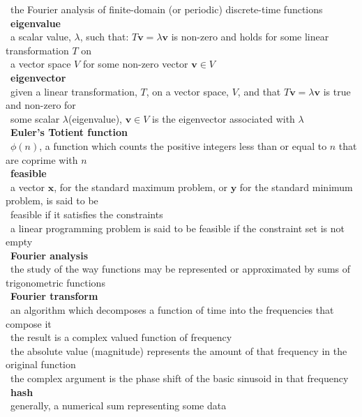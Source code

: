 \documentclass[10pt,letterpaper]{scrartcl}
\newcommand{\tbul}{\textbullet}
\newcommand{\tend}{\>\textendash}
\newcommand{\tasc}{\>\>\textasteriskcentered}
\begin{document}
\begin{tabbing}
    \tend\ the Fourier analysis of finite-domain (or periodic) discrete-time functions \\
\tbul\ \textbf{eigenvalue} \\
    \tend\ a scalar value, $\lambda$, such that: $T\mathbf{v}=\lambda\mathbf{v}$ is non-zero and holds for some linear transformation $T$ on \\ \>\ a vector space $V$ for some non-zero vector $\mathbf{v} \in V$\\
\tbul\ \textbf{eigenvector} \\
    \tend\ given a linear transformation, $T$, on a vector space, $V$, and that $T\mathbf{v}=\lambda\mathbf{v}$ is true and non-zero for \\ \>\ some scalar $\lambda$(eigenvalue), $\mathbf{v} \in V$ is the eigenvector associated with $\lambda$ \\
\tbul\ \textbf{Euler's Totient function} \\
    \tend\ $\phi (n)$, a function which counts the positive integers less than or equal to $n$ that are coprime with $n$\\
\tbul\ \textbf{feasible} \\
    \tend\ a vector $\mathbf{x}$, for the standard maximum problem, or $\mathbf{y}$ for the standard minimum problem, is said to be \\ \>\ feasible if it satisfies the constraints \\
    \tend\ a linear programming problem is said to be feasible if the constraint set is not empty \\
\tbul\ \textbf{Fourier analysis} \\
    \tend\ the study of the way functions may be represented or approximated by sums of trigonometric functions \\
\tbul\ \textbf{Fourier transform} \\
    \tend\ an algorithm which decomposes a function of time into the frequencies that compose it \\
    \tend\ the result is a complex valued function of frequency \\
        \tasc\ the absolute value (magnitude) represents the amount of that frequency in the original function \\
        \tasc\ the complex argument is the phase shift of the basic sinusoid in that frequency \\
\tbul\ \textbf{hash} \\
    \tend\ generally, a numerical sum representing some data \\

\end{tabbing}
\end{document}
